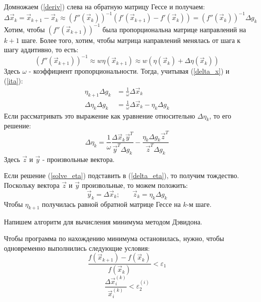 Домножаем (\ref{deriv}) слева на обратную матрицу Гессе и получаем:
\begin{equation}
    \Delta \vec x_k=\vec x_{k+1}-\vec x_k \approx \left(f''(\vec x_k)\right)^{-1}\left(f'(\vec x_{k+1})-f'(\vec x_k)\right) =  \left(f''(\vec x_k)\right)^{-1}\Delta g_k
\label{delta_x}
\end{equation}
Хотим, чтобы $ \left(f''(\vec x_{k+1})\right)^{-1}$ была пропорциональна матрице направлений на $k+1$ шаге. Более того, хотим, чтобы матрица направлений менялась от шага к шагу аддитивно, то есть:
\begin{equation}
    (f''(\vec x_{k+1}))^{-1} \approx w\eta(\vec x_{k+1}) \approx w(\eta(\vec x_k)+\Delta \eta (\vec x_k))
    \label{ita}
\end{equation}
Здесь $\omega$ - коэффициент пропорциональности. Тогда, учитывая (\ref{delta_x}) и (\ref{ita}):
\begin{align}
    \eta_{k+1}\Delta g_k & {}= \frac1{\omega}\Delta \vec x_k \\
    \Delta \eta_{k} \Delta g_k & {} =
    \frac1{\omega} \Delta \vec x_k - \eta_k \Delta g_k
    \label{delta_eta}\end{align}
Если рассматривать это выражение как уравнение относительно $\Delta \eta_k$, то его решение:
\begin{equation}
    \Delta \eta_k = \frac1{\omega}\frac{\Delta\vec x_k {\vec y}^T}{{\vec y}^T \Delta g_k} - \frac{\eta_k \Delta g_k {\vec z}^T}{{\vec z}^T \Delta g_k}
    \label{solve_eta}
\end{equation}
Здесь $\vec z$ и $\vec y$ - произвольные вектора.

Если решение (\ref{solve_eta}) подставить в (\ref{delta_eta}), то получим тождество. Поскольку вектора $\vec z$ и $\vec y$ произвольные, то можем положить:
\begin{equation}
    \vec y_k = \Delta \vec x_k \text{;} \qquad \vec z_k = \eta_k \Delta g_k
\end{equation}
Чтобы $\eta_{k+1}$ получилась равной обратной матрице Гессе на $k$-м шаге.

Напишем алгоритм для вычисления минимума методом Дэвидона.

Чтобы программа по нахождению минимума остановилась, нужно, чтобы одновременно выполнились следующие условия:
\begin{equation}
    \frac{f(\vec x_{k+1}) - f(\vec x_k)}{f(\vec x_k)} < \varepsilon_1
\end{equation}
\begin{equation}
    \frac{\Delta \vec x_i^(k)}{\vec x_i^{(k)}} < \varepsilon_{2}^{(i)}
\end{equation}